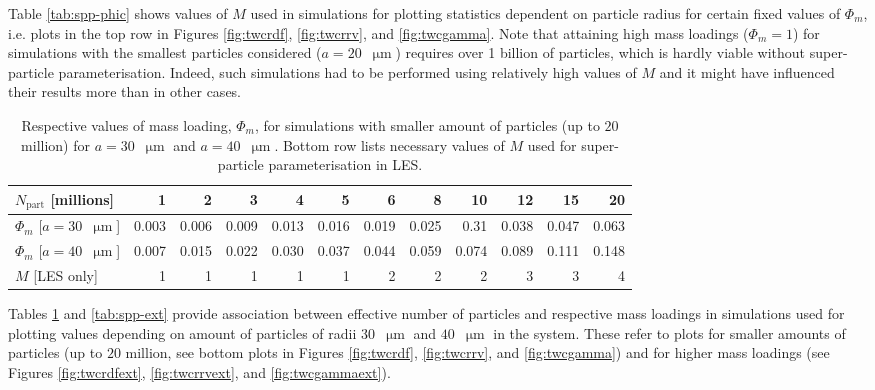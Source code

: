 \documentclass{pracamgren}
\begin{document}
Table \ref{tab:spp-phic} shows values of $M$ used in simulations for plotting statistics dependent on particle radius for certain fixed values of $\Phi_m$, i.e. plots in the top row in Figures \ref{fig:twcrdf}, \ref{fig:twcrrv}, and \ref{fig:twcgamma}.
Note that attaining high mass loadings ($\Phi_m = 1$) for simulations with the smallest particles considered ($a = 20$~$\upmu\text{m}$) requires over 1 billion of particles, which is hardly viable without super-particle parameterisation.
Indeed, such simulations had to be performed using relatively high values of $M$ and it might have influenced their results more than in other cases.

\begin{table}[h]
\centering
\scriptsize
\begin{tabular}{lrrrrrrrrrrr}
$N_{\text{part}}$ [millions] & 1 & 2 & 3 & 4 & 5 & 6 & 8 & 10 & 12 & 15 & 20 \\ \hline
$\Phi_m$ [$a = 30$~$\upmu\text{m}$] & 0.003 & 0.006 & 0.009 & 0.013 & 0.016 & 0.019 & 0.025 & 0.31 & 0.038 & 0.047 & 0.063 \\
$\Phi_m$ [$a = 40$~$\upmu\text{m}$] & 0.007 & 0.015 & 0.022 & 0.030 & 0.037 & 0.044 & 0.059 & 0.074 & 0.089 & 0.111 & 0.148 \\
$M$ [LES only] & 1 & 1 & 1 & 1 & 1 & 2 & 2 & 2 & 3 & 3 & 4 \\
\end{tabular}
\caption{Respective values of mass loading, $\Phi_m$, for simulations with smaller amount of particles (up to $20$ million) for ${a = 30}$~$\upmu\text{m}$ and ${a = 40}$~$\upmu\text{m}$.
Bottom row lists necessary values of $M$ used for super-particle parameterisation in LES.
}
\label{tab:spp-base}
\end{table}

Tables \ref{tab:spp-base} and \ref{tab:spp-ext} provide association between effective number of particles and respective mass loadings in simulations used for plotting values depending on amount of particles of radii $30$~$\upmu\text{m}$ and $40$~$\upmu\text{m}$ in the system.
These refer to plots for smaller amounts of particles (up to $20$ million, see bottom plots in Figures \ref{fig:twcrdf}, \ref{fig:twcrrv}, and \ref{fig:twcgamma}) and for higher mass loadings (see Figures \ref{fig:twcrdfext}, \ref{fig:twcrrvext}, and \ref{fig:twcgammaext}).
\end{document}
